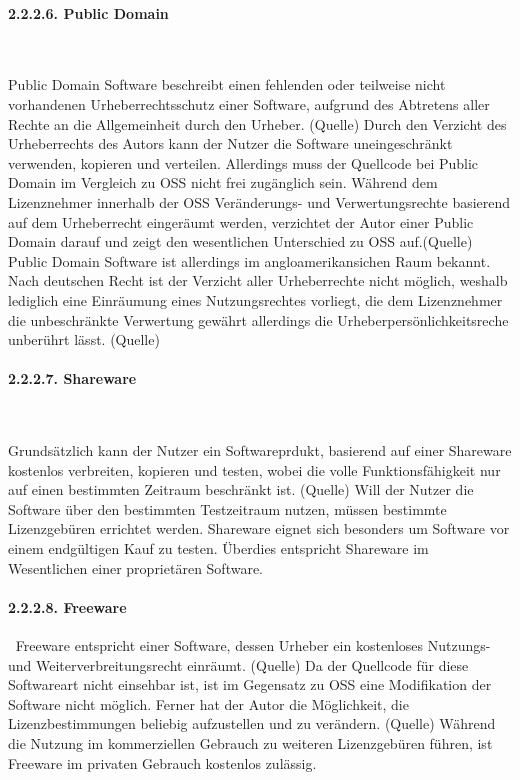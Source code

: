 \paragraph{2.2.2.6. Public Domain}$~$

Public Domain Software beschreibt einen fehlenden oder teilweise nicht vorhandenen Urheberrechtsschutz einer Software, aufgrund des Abtretens aller Rechte an die Allgemeinheit durch den Urheber. (Quelle) Durch den Verzicht des Urheberrechts des Autors kann der Nutzer die Software uneingeschränkt verwenden, kopieren und verteilen. Allerdings muss der Quellcode bei Public Domain im Vergleich zu OSS nicht frei zugänglich sein.  Während dem Lizenznehmer innerhalb der OSS Veränderungs- und Verwertungsrechte basierend auf dem Urheberrecht eingeräumt werden, verzichtet der Autor einer Public Domain darauf und zeigt den wesentlichen Unterschied zu OSS auf.(Quelle) Public Domain Software ist allerdings im angloamerikansichen Raum bekannt. Nach deutschen Recht ist der Verzicht aller Urheberrechte nicht möglich, weshalb lediglich eine Einräumung eines Nutzungsrechtes vorliegt, die dem Lizenznehmer die unbeschränkte Verwertung gewährt allerdings die Urheberpersönlichkeitsreche unberührt lässt. (Quelle)

\paragraph{2.2.2.7. Shareware}$~$

Grundsätzlich kann der Nutzer ein Softwareprdukt, basierend auf einer Shareware kostenlos verbreiten, kopieren und testen, wobei die volle Funktionsfähigkeit nur auf einen bestimmten Zeitraum beschränkt ist. (Quelle) Will der Nutzer die Software über den bestimmten Testzeitraum nutzen, müssen bestimmte Lizenzgebüren errichtet werden. Shareware eignet sich besonders um Software vor einem endgültigen Kauf zu testen. Überdies entspricht Shareware im Wesentlichen einer proprietären Software.

\paragraph{2.2.2.8. Freeware}$~$
Freeware entspricht einer Software, dessen Urheber ein kostenloses Nutzungs- und Weiterverbreitungsrecht einräumt. (Quelle) Da der Quellcode für diese Softwareart nicht einsehbar ist, ist im Gegensatz zu OSS eine Modifikation der Software nicht möglich. Ferner hat der Autor die Möglichkeit, die Lizenzbestimmungen beliebig aufzustellen und zu verändern. (Quelle) Während die Nutzung im kommerziellen Gebrauch zu weiteren Lizenzgebüren führen, ist Freeware im privaten Gebrauch kostenlos zulässig.\\

